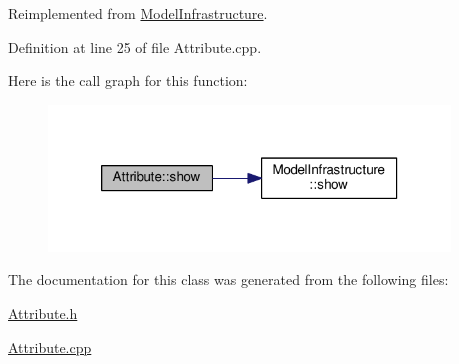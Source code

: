 Reimplemented from \hyperlink{class_model_infrastructure_a649a5a89a0c9931783d3c51de2acf266}{Model\-Infrastructure}.



Definition at line 25 of file Attribute.\-cpp.



Here is the call graph for this function\-:\nopagebreak
\begin{figure}[H]
\begin{center}
\leavevmode
\includegraphics[width=302pt]{class_attribute_aa29f79466bd6ed5e36c402ec57cb2050_cgraph}
\end{center}
\end{figure}




The documentation for this class was generated from the following files\-:\begin{DoxyCompactItemize}
\item 
\hyperlink{_attribute_8h}{Attribute.\-h}\item 
\hyperlink{_attribute_8cpp}{Attribute.\-cpp}\end{DoxyCompactItemize}
